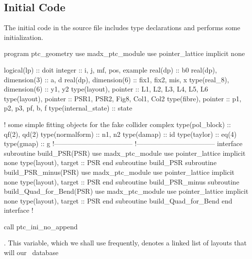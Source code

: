 \subsection{Initial Code}
\label{sec:init.code}

The initial code in the  source file
includes type declarations and performs some initialization.

\begin{ptccode}[
  label={\ptctitle{\ptc{ptc_geometry.f90}\quad\small This program
                   describes the geometry of several \PTC\ lattices.}}
]
program ptc_geometry
use madx_ptc_module
use pointer_lattice
implicit none

logical(lp) :: doit
integer :: i, j, mf, pos, example
real(dp) :: b0
real(dp), dimension(3) :: a, d
real(dp), dimension(6) :: fix1, fix2, mis, x
type(real_8), dimension(6) :: y1, y2
type(layout), pointer :: L1, L2, L3, L4, L5, L6
type(layout), pointer :: PSR1, PSR2, Fig8, Col1, Col2
type(fibre), pointer :: p1, p2, p3, pf, b, f
type(internal_state) :: state

! some simple fitting objects for the fake collider complex
type(pol_block) :: qf(2), qd(2) 
type(normalform) :: n1, n2
type(damap) :: id
type(taylor) :: eq(4)
type(gmap) :: g
!-----------------------------------
!-----------------------------------
    interface
       subroutine build_PSR(PSR)
         use madx_ptc_module
         use pointer_lattice
         implicit none
         type(layout), target :: PSR
       end subroutine build_PSR
       subroutine build_PSR_minus(PSR)
         use madx_ptc_module
         use pointer_lattice
         implicit none
         type(layout), target :: PSR
       end subroutine build_PSR_minus
       subroutine build_Quad_for_Bend(PSR)
         use madx_ptc_module
         use pointer_lattice
         implicit none
         type(layout), target :: PSR
       end subroutine build_Quad_for_Bend
    end interface
!

call ptc_ini_no_append          \label{lin:init.layout}
\end{ptccode}


%
.\label{mad.univ}%
This variable, which we shall use frequently, denotes a linked list
of layouts%
that will  our \DNA\ database  


